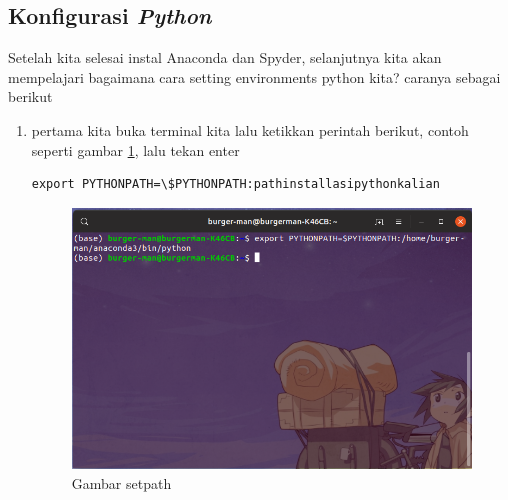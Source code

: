 \subsection{Konfigurasi \textbf{\textit{Python}}}
Setelah kita selesai instal Anaconda dan Spyder, selanjutnya kita akan mempelajari bagaimana cara setting environments python kita? caranya sebagai berikut

\begin{enumerate}

\item pertama kita buka terminal kita lalu ketikkan perintah berikut, contoh seperti gambar \ref{setpath}, lalu tekan enter
\begin{lstlisting}
export PYTHONPATH=\$PYTHONPATH:pathinstallasipythonkalian
\end{lstlisting}
\begin{figure}[H]
\centering
\includegraphics[width=1\textwidth]{figures/ubuntu/setpath.png}
\caption{Gambar setpath}
\label{setpath}
\end{figure}

\end{enumerate}

